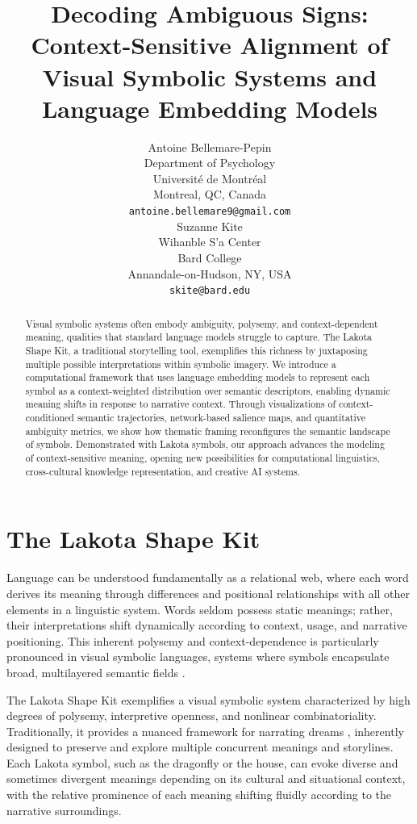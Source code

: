 \documentclass[final,creativeai]{article}
\title{Decoding Ambiguous Signs: Context-Sensitive Alignment of Visual Symbolic Systems and \\Language Embedding Models}
\author{%
  Antoine Bellemare-Pepin \\
  Department of Psychology \\
  Université de Montréal \\
  Montreal, QC, Canada \\
  \texttt{antoine.bellemare9@gmail.com} \\
  \And
  Suzanne Kite \\
  Wihanble S'a Center \\
  Bard College \\
  Annandale-on-Hudson, NY, USA \\
  \texttt{skite@bard.edu} \\
}
\begin{document}
\maketitle

\begin{abstract}
Visual symbolic systems often embody ambiguity, polysemy, and context-dependent meaning, qualities that standard language models struggle to capture. The Lakota Shape Kit, a traditional storytelling tool, exemplifies this richness by juxtaposing multiple possible interpretations within symbolic imagery. We introduce a computational framework that uses language embedding models to represent each symbol as a context-weighted distribution over semantic descriptors, enabling dynamic meaning shifts in response to narrative context. Through visualizations of context-conditioned semantic trajectories, network-based salience maps, and quantitative ambiguity metrics, we show how thematic framing reconfigures the semantic landscape of symbols. Demonstrated with Lakota symbols, our approach advances the modeling of context-sensitive meaning, opening new possibilities for computational linguistics, cross-cultural knowledge representation, and creative AI systems.
\end{abstract}

\section{The Lakota Shape Kit}
Language can be understood fundamentally as a relational web, where each word derives its meaning through differences and positional relationships with all other elements in a linguistic system\cite{stawarska_saussures_2020, wood_derrida_1988}. Words seldom possess static meanings; rather, their interpretations shift dynamically according to context, usage, and narrative positioning. This inherent polysemy and context-dependence is particularly pronounced in visual symbolic languages, systems where symbols encapsulate broad, multilayered semantic fields \citep{saint-martin_semiotics_1990}.

The Lakota Shape Kit \cite{wing_learning_2016} exemplifies a visual symbolic system characterized by high degrees of polysemy, interpretive openness, and nonlinear combinatoriality. Traditionally, it provides a nuanced framework for narrating dreams \citep{kite_hel_2023}, inherently designed to preserve and explore multiple concurrent meanings and storylines. Each Lakota symbol, such as the dragonfly or the house, can evoke diverse and sometimes divergent meanings depending on its cultural and situational context, with the relative prominence of each meaning shifting fluidly according to the narrative surroundings.
\end{document}
